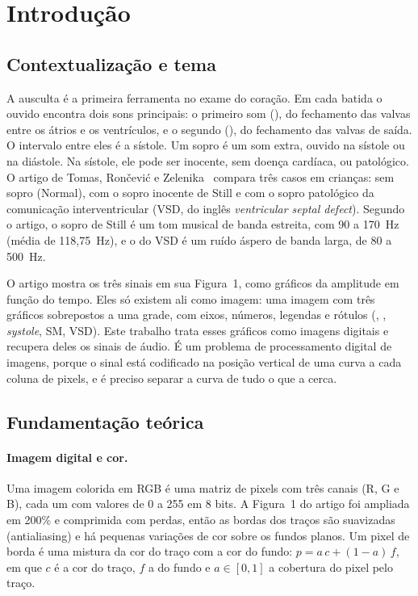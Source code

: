 \section{Introdução}

\subsection{Contextualização e tema}

A ausculta é a primeira ferramenta no exame do coração. Em cada batida o ouvido encontra dois sons principais: o primeiro som (\Sone), do fechamento das valvas entre os átrios e os ventrículos, e o segundo (\Stwo), do fechamento das valvas de saída. O intervalo entre eles é a sístole. Um sopro é um som extra, ouvido na sístole ou na diástole. Na sístole, ele pode ser inocente, sem doença cardíaca, ou patológico. O artigo de Tomas, Rončević e Zelenika~\cite{tomas2011} compara três casos em crianças: sem sopro (Normal), com o sopro inocente de Still e com o sopro patológico da comunicação interventricular (VSD, do inglês \emph{ventricular septal defect}). Segundo o artigo, o sopro de Still é um tom musical de banda estreita, com 90 a 170~Hz (média de 118,75~Hz), e o do VSD é um ruído áspero de banda larga, de 80 a 500~Hz.

O artigo mostra os três sinais em sua Figura~1, como gráficos da amplitude em função do tempo. Eles só existem ali como imagem: uma imagem com três gráficos sobrepostos a uma grade, com eixos, números, legendas e rótulos (\Sone, \Stwo, \emph{systole}, SM, VSD). Este trabalho trata esses gráficos como imagens digitais e recupera deles os sinais de áudio. É um problema de processamento digital de imagens, porque o sinal está codificado na posição vertical de uma curva a cada coluna de pixels, e é preciso separar a curva de tudo o que a cerca.

\subsection{Fundamentação teórica}

\paragraph{Imagem digital e cor.}
Uma imagem colorida em RGB é uma matriz de pixels com três canais (R, G e B), cada um com valores de 0 a 255 em 8 bits. A Figura~1 do artigo foi ampliada em 200\% e comprimida com perdas, então as bordas dos traços são suavizadas (antialiasing) e há pequenas variações de cor sobre os fundos planos. Um pixel de borda é uma mistura da cor do traço com a cor do fundo: $p = a\,c + (1-a)\,f$, em que $c$ é a cor do traço, $f$ a do fundo e $a \in [0,1]$ a cobertura do pixel pelo traço.

